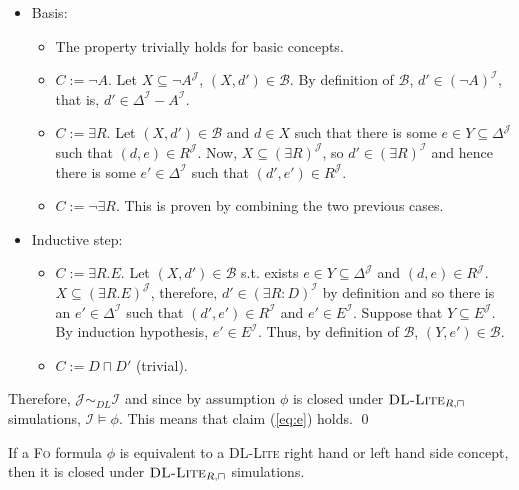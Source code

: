 \documentclass[11pt]{llncs}
\newcommand{\logic}[1]{\textsc{#1}\xspace}
\newcommand{\FOL}{\logic{Fo}}
\newcommand{\g}[1]{\logic{#1}}
\newcommand{\inte}{\f{I}}
\newcommand{\tup}[1]{(#1)}
\newcommand{\f}[1]{\mathcal{#1}}
\newcommand{\dlliterc}{\g{DL-Lite}_{R,\sqcap}\xspace}
\begin{document}
\begin{itemize}
\item Basis:
\begin{itemize}
\item The property trivially holds for basic concepts. 
\item $C := \neg A$. Let $X \subseteq \neg A^{\f{J}}$,
$\tup{X,d'} \in \f{B}$. By definition of $\f{B}$, $d' \in (\neg A)^{\f{I}}$, that is,
$d' \in \Delta^{\f{I}} - A^{\f{I}}$.
\item $C := \exists R$. Let $\tup{X,d'} \in \f{B}$
and $d \in X$ such that there is some $e \in Y \subseteq \Delta^{\f{J}}$
such that $\tup{d,e} \in R^{\f{J}}$. Now, $X \subseteq (\exists R)^{\f{J}}$, so
$d' \in (\exists R)^{\f{I}}$ and hence there is some $e' \in \Delta^{\f{I}}$
such that $\tup{d',e'} \in R^{\f{J}}$.
\item $C := \neg \exists R$. This is proven by combining the two
previous cases.
\end{itemize}
\item Inductive step:
\begin{itemize}
\item $C := \exists R . E$. Let $\tup{X,d'} \in \f{B}$ s.t.
exists $e \in Y \subseteq \Delta^{\f{J}}$ and
$\tup{d,e} \in R^{\f{J}}$. $X \subseteq (\exists R . E)^{\f{J}}$,
therefore, $d' \in (\exists R \colon D)^{\f{I}}$ by definition
and so there is an $e' \in \Delta^{\f{I}}$ such that $\tup{d',e'} \in R^{\f{I}}$
and $e' \in E^{\f{I}}$. Suppose that
$Y \subseteq E^{\f{J}}$. By induction hypothesis, $e' \in E^{\inte}$.
Thus, by definition of $\f{B}$,
$\tup{Y,e'} \in \f{B}$.
\item $C := D \sqcap D'$ (trivial).
\end{itemize}
\end{itemize}

Therefore, $\f{J} \sim_{DL} \f{I}$ 
and since by assumption $\phi$ is closed under
$\dlliterc$ simulations, $\f{I} \models \phi$.
This means that claim (\ref{eq:e}) holds. \qed


\begin{lemma}
If a \FOL formula $\phi$ is equivalent to a \g{DL-Lite}
right hand or left hand side concept, then it is closed
under $\dlliterc$ simulations.
\end{lemma}
\end{document}
